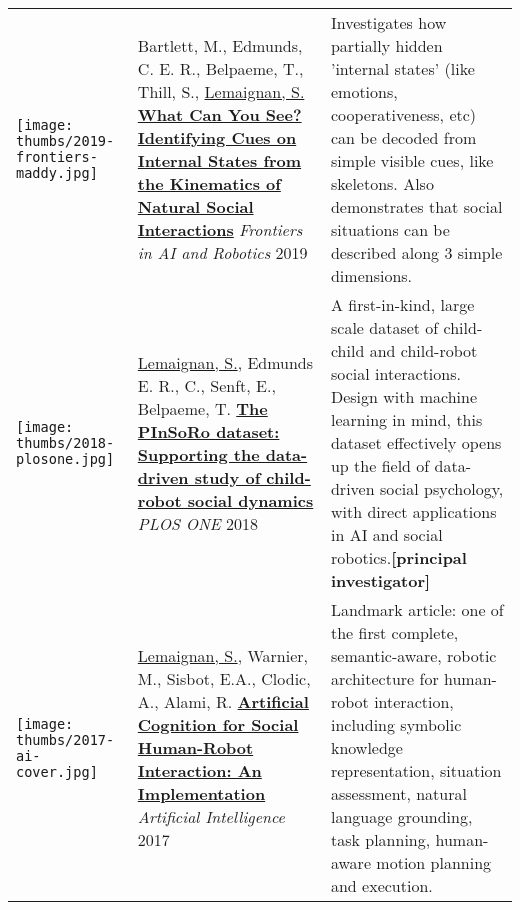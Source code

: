 \begin{tabular}{p{1.7cm}p{7cm}p{8cm}}
    \vspace{-.20cm}\texttt{[image: thumbs/2019-frontiers-maddy.jpg]} &

    Bartlett, M., Edmunds, C. E. R., Belpaeme, T., Thill, S., \ul{Lemaignan, S.} 
    \href{https://doi.org/10.3389/frobt.2019.00049}{\textbf{What Can You See? Identifying Cues on Internal States from the
    Kinematics of Natural Social Interactions}} 
    \newline \textit{Frontiers in AI and Robotics} 2019
    & \small Investigates how partially hidden 'internal states' (like emotions,
    cooperativeness, etc) can be decoded from simple visible cues, like
    skeletons. Also demonstrates that social situations can be described along 3
    simple dimensions.\textbf{}\\


    \vspace{-.20cm}\texttt{[image: thumbs/2018-plosone.jpg]} &

    \ul{Lemaignan, S.}, Edmunds E. R., C., Senft, E., Belpaeme, T.
    \newline\href{https://doi.org/10.1371/journal.pone.0205999}{\textbf{The
    PInSoRo dataset: Supporting the data-driven study of child-robot social
    dynamics}}
    \newline \textit{PLOS ONE} 2018
    & \small A first-in-kind, large scale dataset of child-child and child-robot social interactions. Design
    with machine learning in mind, this dataset effectively opens up the field
    of data-driven social psychology, with direct applications in AI and social
    robotics.\textbf{[principal investigator]}\\


    \vspace{-.20cm}\texttt{[image: thumbs/2017-ai-cover.jpg]} &

    \ul{Lemaignan, S.}, Warnier, M., Sisbot, E.A., Clodic, A., Alami, R.
    \newline
    \href{https://doi.org/10.1016/j.artint.2016.07.002}{\textbf{Artificial
    Cognition for Social Human-Robot Interaction: An Implementation}}
    \newline \textit{Artificial Intelligence} 2017
    & \small Landmark article: one of the first complete, semantic-aware, robotic architecture for
    human-robot interaction, including symbolic knowledge representation,
    situation assessment, natural language grounding, task planning, human-aware
    motion planning and execution. \textbf{}\\



\end{tabular}
